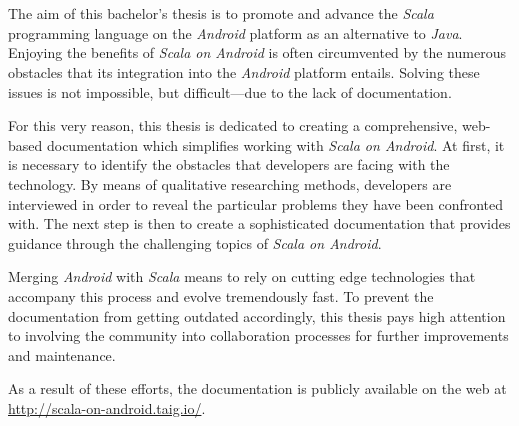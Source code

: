 \section*{}

The aim of this bachelor's thesis is to promote and advance the \textit{Scala} programming language on the \textit{Android} platform as an alternative to \textit{Java}. Enjoying the benefits of \textit{Scala on Android} is often circumvented by the numerous obstacles that its integration into the \textit{Android} platform entails. Solving these issues is not impossible, but difficult---due to the lack of documentation.

For this very reason, this thesis is dedicated to creating a comprehensive, web-based documentation which simplifies working with \textit{Scala on Android}. At first, it is necessary to identify the obstacles that developers are facing with the technology. By means of qualitative researching methods, developers are interviewed in order to reveal the particular problems they have been confronted with. The next step is then to create a sophisticated documentation that provides guidance through the challenging topics of \textit{Scala on Android}.

Merging \textit{Android} with \textit{Scala} means to rely on cutting edge technologies that accompany this process and evolve tremendously fast. To prevent the documentation from getting outdated accordingly, this thesis pays high attention to involving the community into collaboration processes for further improvements and maintenance.

As a result of these efforts, the documentation is publicly available on the web at \url{http://scala-on-android.taig.io/}.